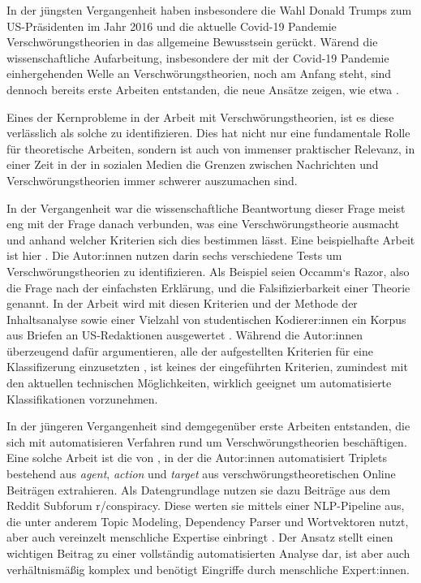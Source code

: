 In der jüngsten Vergangenheit haben insbesondere die Wahl Donald Trumps zum US-Präsidenten im Jahr 2016 und die aktuelle Covid-19 Pandemie Verschwörungstheorien in das allgemeine Bewusstsein gerückt.
Wärend die wissenschaftliche Aufarbeitung, insbesondere der mit der Covid-19 Pandemie einhergehenden Welle an Verschwörungstheorien, noch am Anfang steht, sind dennoch bereits erste Arbeiten entstanden, die neue Ansätze zeigen, wie etwa \textcite{shahsavari_2020}.

Eines der Kernprobleme in der Arbeit mit Verschwörungstheorien, ist es diese verlässlich als solche zu identifizieren.
Dies hat nicht nur eine fundamentale Rolle für theoretische Arbeiten, sondern ist auch von immenser praktischer Relevanz, in einer Zeit in der in sozialen Medien die Grenzen zwischen Nachrichten und Verschwörungstheorien immer schwerer auszumachen sind.

In der Vergangenheit war die wissenschaftliche Beantwortung dieser Frage meist eng mit der Frage danach verbunden, was eine Verschwörungstheorie ausmacht und anhand welcher Kriterien sich dies bestimmen lässt.
Eine beispielhafte Arbeit ist hier \textcite{uscinski_2014}.
Die Autor:innen nutzen darin sechs verschiedene Tests um Verschwörungstheorien zu identifizieren. Als Beispiel seien Occamm`s Razor, also die Frage nach der einfachsten Erklärung, und die Falsifizierbarkeit einer Theorie genannt.
In der Arbeit wird mit diesen Kriterien und der Methode der Inhaltsanalyse sowie einer Vielzahl von studentischen Kodierer:innen ein Korpus aus Briefen an US-Redaktionen ausgewertet \parencite[54ff]{uscinski_2014}.
Während die Autor:innen überzeugend dafür argumentieren, alle der aufgestellten Kriterien für eine Klassifizerung einzusetzten \parencite[52f]{uscinski_2014}, ist keines der eingeführten Kriterien, zumindest mit den aktuellen technischen Möglichkeiten, wirklich geeignet um automatisierte Klassifikationen vorzunehmen.

In der jüngeren Vergangenheit sind demgegenüber erste Arbeiten entstanden, die sich mit automatisieren Verfahren rund um Verschwörungstheorien beschäftigen.
Eine solche Arbeit ist die von \textcite{samory_2018}, in der die Autor:innen automatisiert Triplets bestehend aus \textit{agent}, \textit{action} und \textit{target} aus verschwörungstheoretischen Online Beiträgen extrahieren.
Als Datengrundlage nutzen sie dazu Beiträge aus dem Reddit Subforum r/conspiracy.
Diese werten sie mittels einer NLP-Pipeline aus, die unter anderem Topic Modeling, Dependency Parser und Wortvektoren nutzt, aber auch vereinzelt menschliche Expertise einbringt \parencite[][6ff]{samory_2018}.
Der Ansatz stellt einen wichtigen Beitrag zu einer vollständig automatisierten Analyse dar, ist aber auch verhältnismäßig komplex und benötigt Eingriffe durch menschliche Expert:innen.

